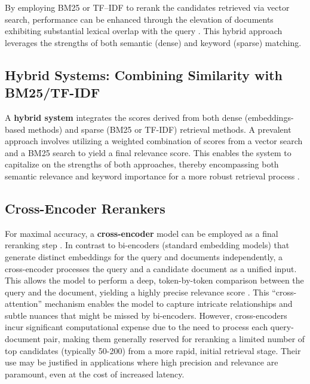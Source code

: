 By employing BM25 or TF–IDF to rerank the candidates retrieved via vector search, performance can be enhanced through the elevation of documents exhibiting substantial lexical overlap with the query \autocite{gao2024retrievalaugmentedgenerationlargelanguage}. This hybrid approach leverages the strengths of both semantic (dense) and keyword (sparse) matching.

\subsection{Hybrid Systems: Combining Similarity with BM25/TF-IDF}
A \textbf{hybrid system} integrates the scores derived from both dense (embeddings-based methods) and sparse (BM25 or TF-IDF) retrieval methods. A prevalent approach involves utilizing a weighted combination of scores from a vector search and a BM25 search to yield a final relevance score. This enables the system to capitalize on the strengths of both approaches, thereby encompassing both semantic relevance and keyword importance for a more robust retrieval process \autocite{gao2024retrievalaugmentedgenerationlargelanguage}.

\subsection{Cross-Encoder Rerankers}
For maximal accuracy, a \textbf{cross-encoder} model can be employed as a final reranking step \autocite{nogueira2019passage}. In contrast to bi-encoders (standard embedding models) that generate distinct embeddings for the query and documents independently, a cross-encoder processes the query and a candidate document as a unified input. This allows the model to perform a deep, token-by-token comparison between the query and the document, yielding a highly precise relevance score \autocite{khattab2020colbertefficienteffectivepassage}. This \enquote{cross-attention} mechanism enables the model to capture intricate relationships and subtle nuances that might be missed by bi-encoders. However, cross-encoders incur significant computational expense due to the need to process each query-document pair, making them generally reserved for reranking a limited number of top candidates (typically 50-200) from a more rapid, initial retrieval stage. Their use may be justified in applications where high precision and relevance are paramount, even at the cost of increased latency.

